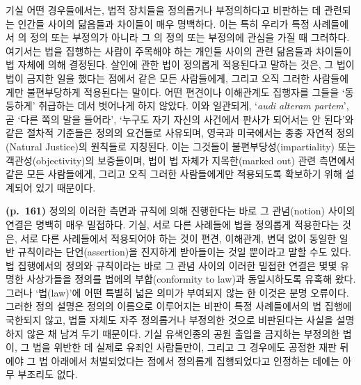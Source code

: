 기실 어떤 경우들에서는, 법적 장치들을 정의롭거나 부정의하다고 비판하는
데 관련되는 인간들 사이의 닮음들과 차이들이 매우 명백하다. 이는 특히
우리가 특정 사례들에서 의 정의 또는 부정의가 아니라 그
의 정의 또는 부정의에 관심을 가질 때 그러하다.
여기서는 법을 집행하는 사람이 주목해야 하는 개인들 사이의 관련 닮음들과
차이들이 법 자체에 의해 결정된다. 살인에 관한 법이 정의롭게 적용된다고
말하는 것은, 그 법이 법이 금지한 일을 했다는 점에서 같은 모든
사람들에게, 그리고 오직 그러한 사람들에게만 불편부당하게 적용된다는
말이다. 어떤 편견이나 이해관계도 집행자를 그들을 ‘동등하게’ 취급하는
데서 벗어나게 하지 않았다. 이와 일관되게, `\emph{audi alteram partem}',
곧 ‘다른 쪽의 말을 들어라’, ‘누구도 자기 자신의 사건에서 판사가 되어서는
안 된다’와 같은 절차적 기준들은 정의의 요건들로 사유되며, 영국과
미국에서는 종종 자연적 정의(Natural Justice)의 원칙들로 지칭된다. 이는
그것들이 불편부당성(impartiality) 또는 객관성(objectivity)의 보증들이며,
법이 법 자체가 지목한(marked out) 관련 측면에서 같은 모든 사람들에게,
그리고 오직 그러한 사람들에게만 적용되도록 확보하기 위해 설계되어 있기
때문이다.

\textbf{(p.~161)} 정의의 이러한 측면과 규칙에 의해 진행한다는 바로 그
관념(notion) 사이의 연결은 명백히 매우 밀접하다. 기실, 서로 다른
사례들에 법을 정의롭게 적용한다는 것은, 서로 다른 사례들에서 적용되어야
하는 것이 편견, 이해관계, 변덕 없이 동일한 일반 규칙이라는
단언(assertion)을 진지하게 받아들이는 것일 뿐이라고 말할 수도 있다. 법
집행에서의 정의와 규칙이라는 바로 그 관념 사이의 이러한 밀접한 연결은
몇몇 유명한 사상가들을 정의를 법에의 부합(conformity to law)과
동일시하도록 유혹해 왔다. 그러나 ‘법(law)’에 어떤 특별히 넓은 의미가
부여되지 않는 한 이것은 분명 오류이다. 그러한 정의 설명은 정의의
이름으로 이루어지는 비판이 특정 사례들에서의 법 집행에 국한되지 않고,
법들 자체도 자주 정의롭거나 부정의한 것으로 비판된다는 사실을 설명하지
않은 채 남겨 두기 때문이다. 기실 유색인종의 공원 출입을 금지하는
부정의한 법이, 그 법을 위반한 데 실제로 유죄인 사람들만이, 그리고 그
경우에도 공정한 재판 뒤에야 그 법 아래에서 처벌되었다는 점에서 정의롭게
집행되었다고 인정하는 데에는 아무 부조리도 없다.

